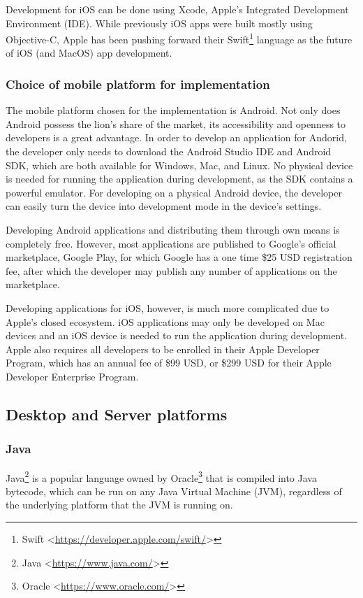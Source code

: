 Development for iOS can be done using Xcode, Apple’s Integrated Development Environment (IDE). While previously iOS apps were built mostly using Objective-C, Apple has been pushing forward their Swift\footnote{Swift <\url{https://developer.apple.com/swift/}>} language as the future of iOS (and MacOS) app development.

\subsubsection*{Choice of mobile platform for implementation}
The mobile platform chosen for the implementation is Android. Not only does Android possess the lion's share of the market, its accessibility and openness to developers is a great advantage. In order to develop an application for Andorid, the developer only needs to download the Android Studio IDE and Android SDK, which are both available for Windows, Mac, and Linux. No physical device is needed for running the application during development, as the SDK contains a powerful emulator. For developing on a physical Android device, the developer can easily turn the device into development mode in the device's settings. 

Developing Android applications and distributing them through own means is completely free. However, most applications are published to Google's official marketplace, Google Play, for which Google has a one time \$25 USD registration fee\cite{google-play-fee}, after which the developer may publish any number of applications on the marketplace.

Developing applications for iOS, however, is much more complicated due to Apple's closed ecosystem. iOS applications may only be developed on Mac devices\cite{apple-dev} and an iOS device is needed to run the application during development. Apple also requires all developers to be enrolled in their Apple Developer Program, which has an annual fee of \$99 USD, or \$299 USD for their Apple Developer Enterprise Program\cite{apple-dev-price}.

\subsection{Desktop and Server platforms}
\subsubsection{Java}
Java\footnote{Java <\url{https://www.java.com/}>} is a popular language owned by Oracle\footnote{Oracle <\url{https://www.oracle.com/}>} that is compiled into Java bytecode, which can be run on any Java Virtual Machine (JVM), regardless of the underlying platform that the JVM is running on. 

